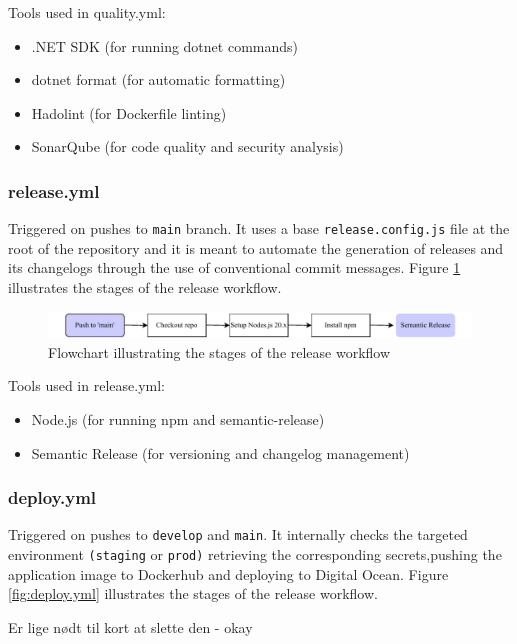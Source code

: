 \noindent  Tools used in quality.yml:

\begin{itemize}
    \item .NET SDK (for running dotnet commands)
    \item dotnet format (for automatic formatting)
    \item Hadolint (for Dockerfile linting)
    \item SonarQube (for code quality and security analysis)
\end{itemize}

\subsubsection{release.yml}
Triggered on pushes to \texttt{main} branch. It uses a base \texttt{release.config.js} file at the root of the repository and it is meant to automate the generation of releases and its changelogs through the use of conventional commit messages. Figure \ref{fig:release.yml} illustrates the stages of the release workflow.

\begin{figure}[H]
    \centering
    \includegraphics[width=\textwidth]{images/figures/Release.pdf}
    \caption{Flowchart illustrating the stages of the release workflow}
    \label{fig:release.yml}
\end{figure}

\noindent  Tools used in release.yml:
\begin{itemize}
    \item Node.js (for running npm and semantic-release)
    \item Semantic Release (for versioning and changelog management)
\end{itemize}

\subsubsection{deploy.yml}
Triggered on pushes to \texttt{develop} and \texttt{main}. It internally checks the targeted environment \texttt{(staging} or \texttt{prod)} retrieving the corresponding secrets,pushing the application image to Dockerhub and deploying to Digital Ocean. Figure \ref{fig:deploy.yml} illustrates the stages of the release workflow.

Er lige nødt til kort at slette den - okay

